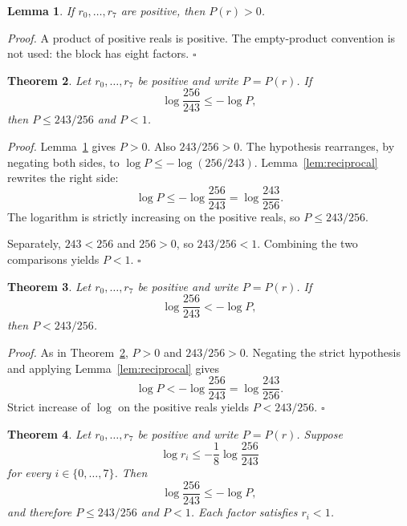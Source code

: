 \documentclass[11pt,letterpaper]{article}
\newtheorem{theorem}{Theorem}
\newtheorem{lemma}[theorem]{Lemma}
\newenvironment{proof}{\noindent\textit{Proof.}}{\hfill\(\square\)}
\begin{document}
\begin{lemma}
\label{lem:product-pos}
If \(r_0,\ldots,r_7\) are positive, then \(P(r)>0\).
\end{lemma}

\begin{proof}
A product of positive reals is positive. The empty-product convention is not used: the block has eight factors.
\end{proof}

\begin{theorem}
\label{thm:contraction}
Let \(r_0,\ldots,r_7\) be positive and write \(P=P(r)\). If
\[
\log\frac{256}{243}\le -\log P,
\]
then \(P\le 243/256\) and \(P<1\).
\end{theorem}

\begin{proof}
Lemma~\ref{lem:product-pos} gives \(P>0\). Also \(243/256>0\). The hypothesis rearranges, by negating both sides, to \(\log P\le -\log(256/243)\). Lemma~\ref{lem:reciprocal} rewrites the right side:
\[
\log P\le -\log\frac{256}{243}=\log\frac{243}{256}.
\]
The logarithm is strictly increasing on the positive reals, so \(P\le 243/256\).

Separately, \(243<256\) and \(256>0\), so \(243/256<1\). Combining the two comparisons yields \(P<1\).
\end{proof}

\begin{theorem}
\label{thm:strict}
Let \(r_0,\ldots,r_7\) be positive and write \(P=P(r)\). If
\[
\log\frac{256}{243}< -\log P,
\]
then \(P<243/256\).
\end{theorem}

\begin{proof}
As in Theorem~\ref{thm:contraction}, \(P>0\) and \(243/256>0\). Negating the strict hypothesis and applying Lemma~\ref{lem:reciprocal} gives
\[
\log P< -\log\frac{256}{243}=\log\frac{243}{256}.
\]
Strict increase of \(\log\) on the positive reals yields \(P<243/256\).
\end{proof}

\begin{theorem}
\label{thm:eight}
Let \(r_0,\ldots,r_7\) be positive and write \(P=P(r)\). Suppose
\[
\log r_i\le -\frac18\log\frac{256}{243}
\]
for every \(i\in\{0,\ldots,7\}\). Then
\[
\log\frac{256}{243}\le -\log P,
\]
and therefore \(P\le 243/256\) and \(P<1\). Each factor satisfies \(r_i<1\).
\end{theorem}
\end{document}
